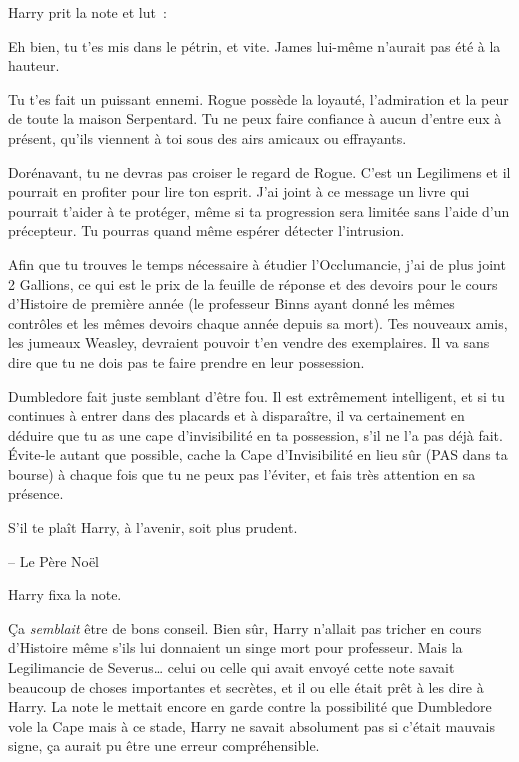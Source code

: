 Harry prit la note et lut~:


\begin{writtenNote}
Eh bien, tu t'es mis dans le pétrin, et vite. James lui-même n'aurait pas été à la hauteur.

Tu t'es fait un puissant ennemi. Rogue possède la loyauté, l'admiration et la peur de toute la maison Serpentard. Tu ne peux faire confiance à aucun d'entre eux à présent, qu'ils viennent à toi sous des airs amicaux ou effrayants.

Dorénavant, tu ne devras pas croiser le regard de Rogue. C'est un Legilimens et il pourrait en profiter pour lire ton esprit. J'ai joint à ce message un livre qui pourrait t'aider à te protéger, même si ta progression sera limitée sans l'aide d'un précepteur. Tu pourras quand même espérer détecter l'intrusion.

Afin que tu trouves le temps nécessaire à étudier l'Occlumancie, j'ai de plus joint 2 Gallions, ce qui est le prix de la feuille de réponse et des devoirs pour le cours d'Histoire de première année (le professeur Binns ayant donné les mêmes contrôles et les mêmes devoirs chaque année depuis sa mort). Tes nouveaux amis, les jumeaux Weasley, devraient pouvoir t'en vendre des exemplaires. Il va sans dire que tu ne dois pas te faire prendre en leur possession.

Dumbledore fait juste semblant d'être fou. Il est extrêmement intelligent, et si tu continues à entrer dans des placards et à disparaître, il va certainement en déduire que tu as une cape d'invisibilité en ta possession, s'il ne l'a pas déjà fait. Évite-le autant que possible, cache la Cape d'Invisibilité en lieu sûr (PAS dans ta bourse) à chaque fois que tu ne peux pas l'éviter, et fais très attention en sa présence.

S'il te plaît Harry, à l'avenir, soit plus prudent.

-- Le Père Noël
\end{writtenNote}

Harry fixa la note.

Ça \emph{semblait} être de bons conseil. Bien sûr, Harry n'allait pas tricher en cours d'Histoire même s'ils lui donnaient un singe mort pour professeur. Mais la Legilimancie de Severus… celui ou celle qui avait envoyé cette note savait beaucoup de choses importantes et secrètes, et il ou elle était prêt à les dire à Harry. La note le mettait encore en garde contre la possibilité que Dumbledore vole la Cape mais à ce stade, Harry ne savait absolument pas si c'était mauvais signe, ça aurait pu être une erreur compréhensible.


